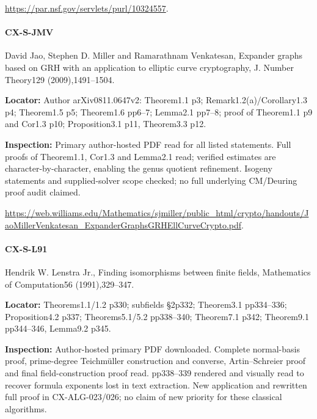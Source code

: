 \documentclass[11pt,a4paper]{article}
\begin{document}
\url{https://par.nsf.gov/servlets/purl/10324557}.

\paragraph{CX-S-JMV} David Jao, Stephen D.\allowbreak{} Miller and Ramarathnam Venkatesan, Expander graphs based on GRH with an application to elliptic curve cryptography, J.\allowbreak{} Number Theory129 (2009),1491–\allowbreak{}1504.

\textbf{Locator:} Author arXiv0811.\allowbreak{}0647v2:\allowbreak{} Theorem1.\allowbreak{}1 p3; Remark1.\allowbreak{}2(a)/\allowbreak{}Corollary1.\allowbreak{}3 p4; Theorem1.\allowbreak{}5 p5; Theorem1.\allowbreak{}6 pp6–\allowbreak{}7; Lemma2.\allowbreak{}1 pp7–\allowbreak{}8; proof of Theorem1.\allowbreak{}1 p9 and Cor1.\allowbreak{}3 p10; Proposition3.\allowbreak{}1 p11, Theorem3.\allowbreak{}3 p12.

\textbf{Inspection:} Primary author-hosted PDF read for all listed statements.\allowbreak{} Full proofs of Theorem1.\allowbreak{}1, Cor1.\allowbreak{}3 and Lemma2.\allowbreak{}1 read; verified estimates are character-by-character, enabling the genus quotient refinement.\allowbreak{} Isogeny statements and supplied-solver scope checked; no full underlying CM/\allowbreak{}Deuring proof audit claimed.\allowbreak{}

\url{https://web.williams.edu/Mathematics/sjmiller/public_html/crypto/handouts/JaoMillerVenkatesan_ExpanderGraphsGRHEllCurveCrypto.pdf}.

\paragraph{CX-S-L91} Hendrik W.\allowbreak{} Lenstra Jr.\allowbreak{}, Finding isomorphisms between finite fields, Mathematics of Computation56 (1991),329–\allowbreak{}347.

\textbf{Locator:} Theorems1.\allowbreak{}1/\allowbreak{}1.\allowbreak{}2 p330; subfields §2p332; Theorem3.\allowbreak{}1 pp334–\allowbreak{}336; Proposition4.\allowbreak{}2 p337; Theorems5.\allowbreak{}1/\allowbreak{}5.\allowbreak{}2 pp338–\allowbreak{}340; Theorem7.\allowbreak{}1 p342; Theorem9.\allowbreak{}1 pp344–\allowbreak{}346, Lemma9.\allowbreak{}2 p345.

\textbf{Inspection:} Author-hosted primary PDF downloaded.\allowbreak{} Complete normal-basis proof, prime-degree Teichmüller construction and converse, Artin–\allowbreak{}Schreier proof and final field-construction proof read.\allowbreak{} pp338–\allowbreak{}339 rendered and visually read to recover formula exponents lost in text extraction.\allowbreak{} New application and rewritten full proof in CX-ALG-023/\allowbreak{}026; no claim of new priority for these classical algorithms.\allowbreak{}
\end{document}

